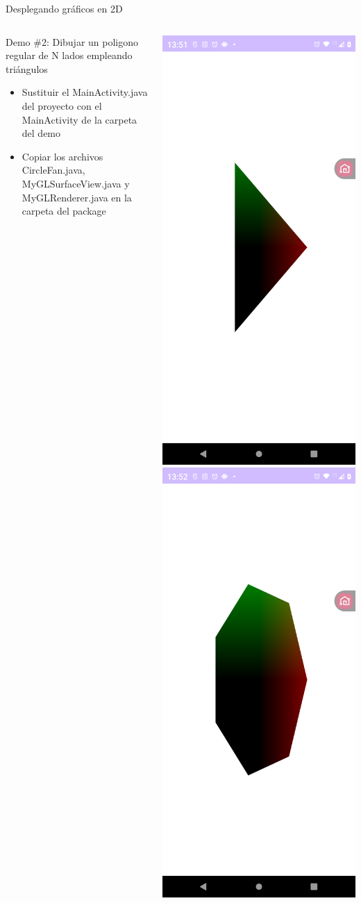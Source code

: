 \documentclass[aspectratio=169,compress]{beamer}
\begin{document}
\begin{frame}{Desplegando gráficos en 2D}

\begin{columns}
\begin{column}{0.5\textwidth}
\begin{block}{Demo \#2: Dibujar un poligono regular de N lados empleando triángulos}
\begin{itemize}
\item Sustituir el MainActivity.java del proyecto con el MainActivity de la carpeta del demo
\item Copiar los archivos CircleFan.java, MyGLSurfaceView.java y MyGLRenderer.java en la carpeta del package
\end{itemize}
\end{block}
\end{column}
\begin{column}{0.5\textwidth}
\begin{center}
\includegraphics[width=0.35\linewidth]{PantallazosDemoTaller/Demo02-1.png}
\includegraphics[width=0.35\linewidth]{PantallazosDemoTaller/Demo02-3.png}

\end{center}
\end{column}
\end{columns}
\end{frame}
\end{document}
